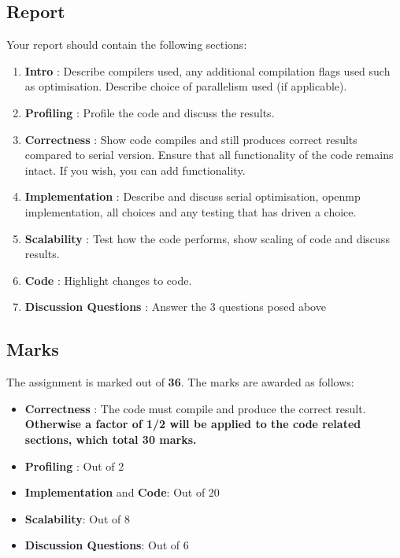 \documentclass[11pt]{amsart}
\begin{document}
\subsection*{Report\nopunct\\}\label{sec:handin:report}
\noindent Your report should contain the following sections:
  \begin{enumerate}
  \item{\textbf{Intro} : Describe compilers used, any additional compilation flags used such as optimisation. Describe choice of parallelism used (if applicable).} 
  \item{\textbf{Profiling} : Profile the code and discuss the results.}
  \item{\textbf{Correctness} : Show code compiles and still produces correct results compared to serial version. Ensure that all functionality of the code remains intact. If you wish, you can add functionality.}
  \item{\textbf{Implementation} : Describe and discuss serial optimisation, openmp implementation, all choices and any testing that has driven a choice.}
  \item{\textbf{Scalability} : Test how the code performs, show scaling of code and discuss results.}
  \item{\textbf{Code} : Highlight changes to code.}
  \item{\textbf{Discussion Questions} : Answer the 3 questions posed above}
\end{enumerate}

\subsection*{Marks\nopunct\\}\label{sec:handin:marks}
\noindent The assignment is marked out of \textbf{36}. The marks are awarded as follows:
\begin{itemize}
  \item{\textbf{Correctness} : The code must compile and produce the correct result. \textbf{Otherwise a factor of 1/2 will be applied to the code related sections, which total 30 marks.}}
  \item{\textbf{Profiling} : Out of 2}
  \item{\textbf{Implementation} and \textbf{Code}: Out of 20}
  \item{\textbf{Scalability}: Out of 8}
  \item{\textbf{Discussion Questions}: Out of 6}
\end{itemize}
\end{document}
